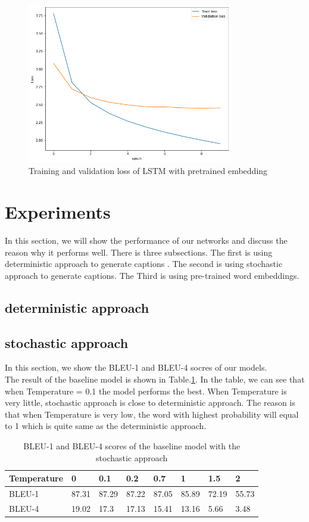 \documentclass{article} %
\begin{document}
\begin{figure}[htb!]
    \centering
     \includegraphics[width=0.8\textwidth]{LSTM_pretrainedloss}
    \caption{Training and validation loss of LSTM with pretrained embedding}
    \label{LSTM_pre_loss}
\end{figure}


\section{Experiments}
In this section, we will show the performance of our networks and discuss the reason why it performs well. There is three subsections. The first is using deterministic approach to generate captions . The second is using stochastic approach to generate captions. The Third is using pre-trained word embeddings.
\subsection{deterministic approach}

\subsection{stochastic approach}
In this section, we show the BLEU-1 and BLEU-4 socres of our models.\\
The result of the baseline model is shown in Table.\ref{baseline_table}. In the table, we can see that when Temperature = 0.1 the model performs the best. When Temperature is very little, stochastic approach is close to deterministic approach. The reason is that when Temperature is very low, the word with highest probability will equal to 1 which is quite same as the deterministic approach.

\begin{table}[htb!]
    \centering
    \begin{tabular}{l|l|l|l|l|l|l|l}
    \hline
    Temperature &0& 0.1   & 0.2   & 0.7   & 1     & 1.5   & 2     \\\hline
    BLEU-1     &87.31& 87.29 & 87.22 & 87.05 & 85.89 & 72.19 & 55.73 \\\hline
    BLEU-4    & 19.02 & 17.3  & 17.13 & 15.41 & 13.16 & 5.66  & 3.48 \\\hline
    \end{tabular}
    \caption{BLEU-1 and BLEU-4 scores of the baseline model with the stochastic approach}
    \label{baseline_table}  
\end{table}
\end{document}
